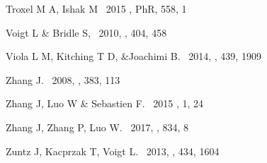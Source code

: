 \documentclass[twocolumn]{aastex62}
\begin{document}
\begin{thebibliography}{}
Troxel M A, Ishak M  \ 2015 , PhR, 558, 1

Voigt L \& Bridle S, \ 2010, \mnras, 404, 458

Viola L M, Kitching T D, \&Joachimi B. \ 2014, \mnras, 439, 1909

 Zhang J. \ 2008, \mnras, 383, 113

 Zhang J, Luo W \& Sebastien F. \ 2015 \jcap, 1, 24

 Zhang J, Zhang P, Luo W. \ 2017, \apj, 834, 8

Zuntz J, Kacprzak T, Voigt L. \ 2013, \mnras, 434, 1604
\end{thebibliography}
\end{document}
